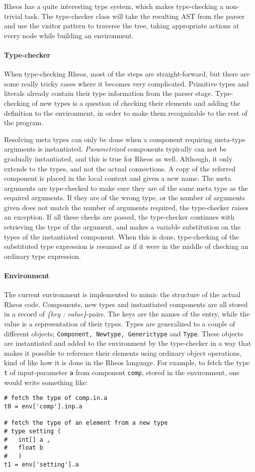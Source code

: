 Rheos has a quite interesting type system, which makes type-checking a
non-trivial task. The type-checker class will take the resulting AST
from the parser and use the visitor pattern to traverse the tree,
taking appropriate actions at every node while building an
environment.

\paragraph{Type-checker}
When type-checking Rheos, most of the steps are straight-forward, but
there are some really tricky cases where it becomes very
complicated. Primitive types and literals already contain their type
information from the parser stage. Type-checking of new types is a
question of checking their elements and adding the definition to the
environment, in order to make them recognizable to the rest of the
program.

Resolving meta types can only be done when a component requiring
meta-type arguments is instantiated. \emph{Parametrized} components
typically can not be gradually instantiated, and this is true for Rheos
as well. Although, it only extends to the types, and not the actual
connections. A copy of the referred component is placed in the local
context and given a new name. The meta arguments are type-checked to
make sure they are of the same meta type as the required arguments. If
they are of the wrong type, or the number of arguments given does not
match the number of arguments required, the type-checker raises an
exception. If all these checks are passed, the type-checker continues
with retrieving the type of the argument, and makes a variable
substitution on the types of the instantiated component. When this is
done, type-checking of the substituted type expression is resumed as if
it were in the middle of checking an ordinary type expression.


\paragraph{Environment}
The current environment is implemented to mimic the structure of the
actual Rheos code. Components, new types and instantiated components
are all stored in a record of \emph{\{key : value\}}-pairs. The keys
are the names of the entry, while the value is a representation of
their types. Types are generalized to a couple of different objects;
\texttt{Component, Newtype, Generictype} and \texttt{Type}. These
objects are instantiated and added to the environment by the
type-checker in a way that makes it possible to reference their
elements using ordinary object operations, kind of like how it is done
in the Rheos language. For example, to fetch the type \texttt{t} of
input-parameter \texttt{a} from component \texttt{comp}, stored in the
environment, one would write something like:

\begin{lstlisting}
# fetch the type of comp.in.a
t0 = env['comp'].inp.a

# fetch the type of an element from a new type
# type setting (
#   int[] a ,
#   float b
#   )
t1 = env['setting'].a
\end{lstlisting}
